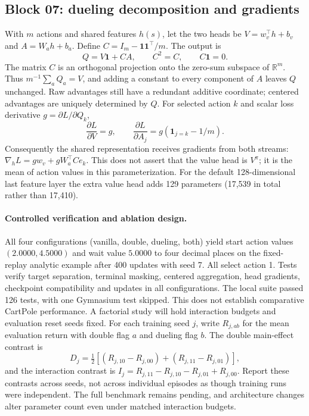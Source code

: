 \documentclass[11pt,a4paper]{article}
\newcommand{\R}{\mathbb R}
\begin{document}
\subsection{Block 07: dueling decomposition and gradients}
With $m$ actions and shared features $h(s)$, let the two heads be
$V=w_v^\top h+b_v$ and $A=W_a h+b_a$. Define
$C=I_m-\mathbf{1}\mathbf{1}^\top/m$. The output is
\[
 Q=V\mathbf{1}+CA,\qquad C^2=C,\qquad C\mathbf{1}=0.
\]
The matrix $C$ is an orthogonal projection onto the zero-sum subspace of
$\R^m$. Thus $m^{-1}\sum_a Q_a=V$, and adding a constant to every component
of $A$ leaves $Q$ unchanged. Raw advantages still have a redundant additive
coordinate; centered advantages are uniquely determined by $Q$.
For selected action $k$ and scalar loss derivative $g=\partial L/\partial Q_k$,
\[
 \frac{\partial L}{\partial V}=g,\qquad
 \frac{\partial L}{\partial A_j}=g(\mathbf{1}_{j=k}-1/m).
\]
Consequently the shared representation receives gradients from both streams:
$\nabla_h L=g w_v+gW_a^\top C e_k$. This does not assert that the value head
is $V^\pi$; it is the mean of action values in this parameterization.
For the default 128-dimensional last feature layer the extra value head
adds 129 parameters (17,539 in total rather than 17,410).

\paragraph{Controlled verification and ablation design.}
All four configurations (vanilla, double, dueling, both) yield start action
values $(2.0000,4.5000)$ and wait value $5.0000$ to four decimal places on the
fixed-replay analytic example after 400 updates with seed 7. All select action
1. Tests verify target separation, terminal masking, centered aggregation,
head gradients, checkpoint compatibility and updates in all configurations.
The local suite passed 126 tests, with one Gymnasium test skipped. This does
not establish comparative CartPole performance. A factorial study will hold
interaction budgets and evaluation reset seeds fixed. For each training seed
$j$, write $R_{j,ab}$ for the mean evaluation return with double flag $a$ and
dueling flag $b$. The double main-effect contrast is
\[
 D_j=\tfrac12[(R_{j,10}-R_{j,00})+(R_{j,11}-R_{j,01})],
\]
and the interaction contrast is
$I_j=R_{j,11}-R_{j,10}-R_{j,01}+R_{j,00}$. Report these contrasts across seeds,
not across individual episodes as though training runs were independent.
The full benchmark remains pending, and architecture changes alter parameter
count even under matched interaction budgets.
\end{document}
